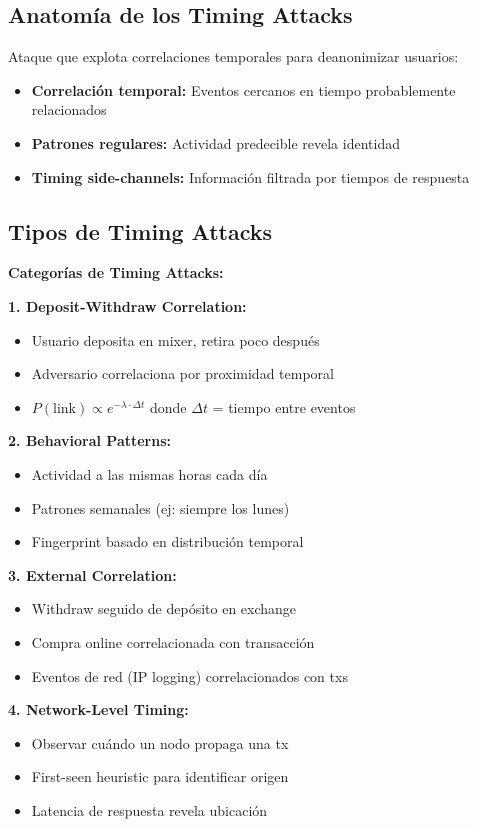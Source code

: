 \documentclass[11pt,a4paper,twoside]{book}
\begin{document}
\subsection{Anatom\'ia de los Timing Attacks}

\begin{definition}
Ataque que explota correlaciones temporales para deanonimizar usuarios:
\begin{itemize}
    \item \textbf{Correlaci\'on temporal:} Eventos cercanos en tiempo probablemente relacionados
    \item \textbf{Patrones regulares:} Actividad predecible revela identidad
    \item \textbf{Timing side-channels:} Informaci\'on filtrada por tiempos de respuesta
\end{itemize}
\end{definition}

\subsection{Tipos de Timing Attacks}

\begin{mathnote}
\textbf{Categor\'ias de Timing Attacks:}

\textbf{1. Deposit-Withdraw Correlation:}
\begin{itemize}
    \item Usuario deposita en mixer, retira poco despu\'es
    \item Adversario correlaciona por proximidad temporal
    \item $P(\text{link}) \propto e^{-\lambda \cdot \Delta t}$ donde $\Delta t$ = tiempo entre eventos
\end{itemize}

\textbf{2. Behavioral Patterns:}
\begin{itemize}
    \item Actividad a las mismas horas cada d\'ia
    \item Patrones semanales (ej: siempre los lunes)
    \item Fingerprint basado en distribuci\'on temporal
\end{itemize}

\textbf{3. External Correlation:}
\begin{itemize}
    \item Withdraw seguido de dep\'osito en exchange
    \item Compra online correlacionada con transacci\'on
    \item Eventos de red (IP logging) correlacionados con txs
\end{itemize}

\textbf{4. Network-Level Timing:}
\begin{itemize}
    \item Observar cu\'ando un nodo propaga una tx
    \item First-seen heuristic para identificar origen
    \item Latencia de respuesta revela ubicaci\'on
\end{itemize}
\end{mathnote}
\end{document}
